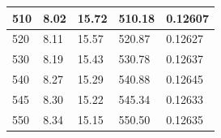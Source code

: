 \documentclass[twocolumn,english]{IEEEtran}
\theoremstyle{plain}
\theoremstyle{plain}
\begin{document}
\begin{table}[htpb]
\begin{tabular}{|l|l|l|l|l|}
510                                                                                              & 8.02                                                                                & 15.72                                                                                & 510.18                                                                                               & 0.12607                              \\ \hline
520                                                                                              & 8.11                                                                                & 15.57                                                                                & 520.87                                                                                               & 0.12627                              \\ \hline
530                                                                                              & 8.19                                                                                & 15.43                                                                                & 530.78                                                                                               & 0.12637                              \\ \hline
540                                                                                              & 8.27                                                                                & 15.29                                                                                & 540.88                                                                                               & 0.12645                              \\ \hline
545                                                                                              & 8.30                                                                                & 15.22                                                                                & 545.34                                                                                               & 0.12633                              \\ \hline
550                                                                                              & 8.34                                                                                & 15.15                                                                                & 550.50                                                                                               & 0.12635                              \\ \hline

\end{tabular}
\end{table}
\end{document}
